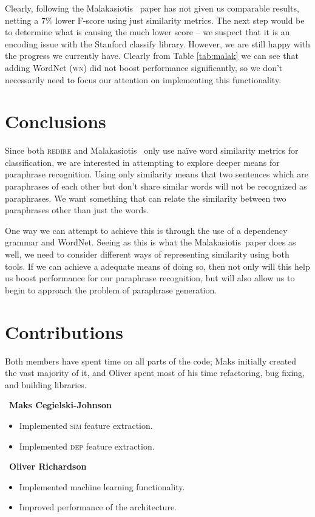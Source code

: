 \documentclass[11pt, reqno]{amsart}
\newcommand{\mala}{Malakasiotis}
\begin{document}
	Clearly, following the \mala~ paper has not given us comparable results, netting a 7\% lower F-score using just similarity metrics. The next step would be to determine what is causing the much lower score -- we suspect that it is an encoding issue with the Stanford classify library. However, we are still happy with the progress we currently have. Clearly from Table \ref{tab:malak} we can see that adding WordNet (\textsc{wn}) did not boost performance significantly, so we don't necessarily need to focus our attention on implementing this functionality.
	\section{Conclusions}
		
	Since both \textsc{redire} and \mala~ only use na\"ive word similarity metrics for classification, we are interested in attempting to explore deeper means for paraphrase recognition. Using only similarity means that two sentences which are paraphrases of each other but don't share similar words will not be recognized as paraphrases. We want something that can relate the similarity between two paraphrases other than just the words. 
	
	One way we can attempt to achieve this is through the use of a dependency grammar and WordNet. Seeing as this is what the \mala~paper does as well, we need to consider different ways of representing similarity using both tools. If we can achieve a adequate means of doing so, then not only will this help us boost performance for our paraphrase recognition, but will also allow us to begin to approach the problem of paraphrase generation.
	
	
	\section{Contributions}
	Both members have spent time on all parts of the code; Maks initially created the vast majority of it, and Oliver spent most of his time refactoring, bug fixing, and building libraries.
	
	\begin{minipage}{.45\textwidth}
	  ~\textbf{Maks Cegielski-Johnson}
	  \begin{itemize}
	  \item Implemented \textsc{sim} feature extraction.
	  \item Implemented \textsc{dep} feature extraction.
	  \end{itemize}
	\end{minipage}%
	\begin{minipage}{.55\textwidth}
	  ~\textbf{Oliver Richardson}
	  \begin{itemize}
	  \item Implemented machine learning functionality.
	  \item Improved performance of the architecture.
	  \end{itemize}
	\end{minipage}
	
	
	
		
\end{document}
